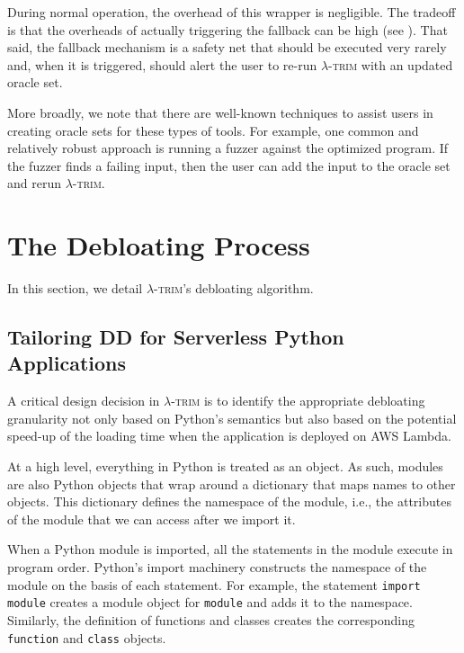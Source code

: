 \documentclass[sigplan,nonacm]{acmart}
\newcommand{\sys}{\textsc{\ensuremath{\lambda}-trim}\xspace}
\newcounter{example}
\newcommand{\module}[1]{{\texttt{#1}}}
\begin{document}
During normal operation, the overhead of this wrapper is negligible.
The tradeoff is that the overheads of actually triggering the fallback can be high (see ).
That said, the fallback mechanism is a safety net that should be executed very rarely and, when it is triggered, should alert the user to re-run \sys with an updated oracle set.












More broadly, we note that there are well-known techniques to assist users in creating oracle sets for these types of tools.
For example, one common and relatively robust approach is running a fuzzer against the optimized program.
If the fuzzer finds a failing input, then the user can add the input to the oracle set and rerun \sys. 

 
\section{The Debloating Process}

In this section, we detail \sys's debloating algorithm.

\subsection{Tailoring DD for Serverless Python Applications}

A critical design decision in \sys is to identify the appropriate debloating granularity not only based on Python's semantics but also based on the potential speed-up of the loading time when the application is deployed on AWS Lambda.

At a high level, everything in Python is treated as an object.
As such, modules are also Python objects that wrap around a dictionary that maps names to other objects.
This dictionary defines the namespace of the module, i.e., the attributes of the module that we can access after we import it.

When a Python module is imported, all the statements in the module execute in program order.
Python's import machinery constructs the namespace of the module on the basis of each statement.
For example, the statement \verb|import module| creates a module object for \module{module} and adds it to the namespace.
Similarly, the definition of functions and classes creates the corresponding \verb|function| and \verb|class| objects.
\end{document}
